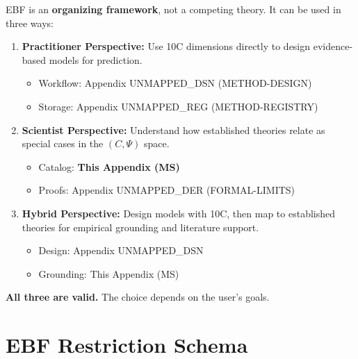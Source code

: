 \begin{tcolorbox}[colback=green!5!white, colframe=green!75!black,
    title=\textbf{Axiom UNMAPPED_MS-0: The Organizing Metatheory Principle}]

EBF is an \textbf{organizing framework}, not a competing theory. It can be
used in three ways:

\begin{enumerate}
    \item \textbf{Practitioner Perspective:} Use 10C dimensions directly to
          design evidence-based models for prediction.
          \begin{itemize}[nosep]
              \item Workflow: Appendix UNMAPPED_DSN (METHOD-DESIGN)
              \item Storage: Appendix UNMAPPED_REG (METHOD-REGISTRY)
          \end{itemize}

    \item \textbf{Scientist Perspective:} Understand how established theories
          relate as special cases in the $(C, \Psi)$ space.
          \begin{itemize}[nosep]
              \item Catalog: \textbf{This Appendix (MS)}
              \item Proofs: Appendix UNMAPPED_DER (FORMAL-LIMITS)
          \end{itemize}

    \item \textbf{Hybrid Perspective:} Design models with 10C, then map to
          established theories for empirical grounding and literature support.
          \begin{itemize}[nosep]
              \item Design: Appendix UNMAPPED_DSN
              \item Grounding: This Appendix (MS)
          \end{itemize}
\end{enumerate}

\textbf{All three are valid.} The choice depends on the user's goals.

\end{tcolorbox}

\section{EBF Restriction Schema}
\label{sec:ms-schema}

